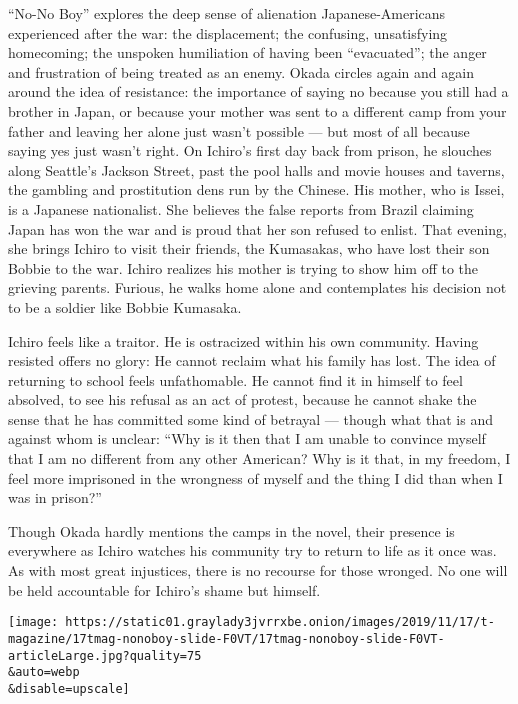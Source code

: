 ``No-No Boy'' explores the deep sense of alienation Japanese-Americans
experienced after the war: the displacement; the confusing, unsatisfying
homecoming; the unspoken humiliation of having been ``evacuated''; the
anger and frustration of being treated as an enemy. Okada circles again
and again around the idea of resistance: the importance of saying no
because you still had a brother in Japan, or because your mother was
sent to a different camp from your father and leaving her alone just
wasn't possible --- but most of all because saying yes just wasn't
right. On Ichiro's first day back from prison, he slouches along
Seattle's Jackson Street, past the pool halls and movie houses and
taverns, the gambling and prostitution dens run by the Chinese. His
mother, who is Issei, is a Japanese nationalist. She believes the false
reports from Brazil claiming Japan has won the war and is proud that her
son refused to enlist. That evening, she brings Ichiro to visit their
friends, the Kumasakas, who have lost their son Bobbie to the war.
Ichiro realizes his mother is trying to show him off to the grieving
parents. Furious, he walks home alone and contemplates his decision not
to be a soldier like Bobbie Kumasaka.

Ichiro feels like a traitor. He is ostracized within his own community.
Having resisted offers no glory: He cannot reclaim what his family has
lost. The idea of returning to school feels unfathomable. He cannot find
it in himself to feel absolved, to see his refusal as an act of protest,
because he cannot shake the sense that he has committed some kind of
betrayal --- though what that is and against whom is unclear: ``Why is
it then that I am unable to convince myself that I am no different from
any other American? Why is it that, in my freedom, I feel more
imprisoned in the wrongness of myself and the thing I did than when I
was in prison?''

Though Okada hardly mentions the camps in the novel, their presence is
everywhere as Ichiro watches his community try to return to life as it
once was. As with most great injustices, there is no recourse for those
wronged. No one will be held accountable for Ichiro's shame but himself.

\texttt{[image: https://static01.graylady3jvrrxbe.onion/images/2019/11/17/t-magazine/17tmag-nonoboy-slide-F0VT/17tmag-nonoboy-slide-F0VT-articleLarge.jpg?quality=75\\\&auto=webp\\\&disable=upscale]}

